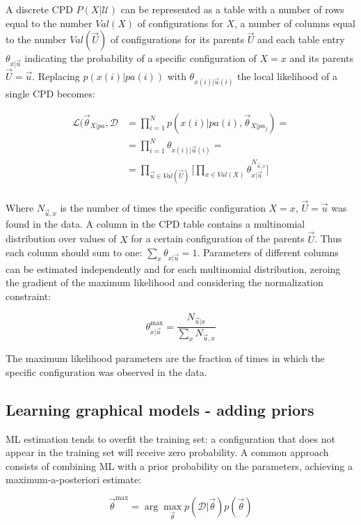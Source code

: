 		A discrete CPD $P(X|\mathcal{U})$ can be represented as a table with a number of rows equal to the number $Val(X)$ of configurations for $X$, a number of columns equal to the number $Val(\vec{U})$ of configurations for its parents $\vec{U}$ and each table entry $\theta_{x|\vec{u}}$ indicating the probability of a specific configuration of $X=x$ and its parents $\vec{U}=\vec{u}$.
		Replacing $p(x(i)|pa(i))$ with $\theta_{x(i)|\vec{u}(i)}$ the local likelihood of a single CPD becomes:

		\begin{align*}
			\mathcal{L}(\vec{\theta}_{X|pa}, \mathcal{D} &= \prod\limits_{i=1}^Np(x(i)|pa(i), \vec{\theta}_{X|pa_j})=\\
																									 &=\prod\limits_{i=1}^N\theta_{x(i)|\vec{u}(i)}=\\
																									 &=\prod\limits_{\vec{u}\in Val(\vec{U})}\biggl[\prod\limits_{x\in Val(X)}\theta_{x|\vec{u}}^{N_{\vec{u}, x}}\biggr]\\
		\end{align*}

		Where $N_{\vec{u},x}$ is the number of times the specific configuration $X=x$, $\vec{U}=\vec{u}$ was found in the data.
		A column in the CPD table contains a multinomial distribution over values of $X$ for a certain configuration of the parents $\vec{U}$.
		Thus each column should sum to one: $\sum\limits_{x}\theta_{x|\vec{u}}=1$.
		Parameters of different columns can be estimated independently and for each multinomial distribution, zeroing the gradient of the maximum likelihood and considering the normalization constraint:

		$$\theta_{x|\vec{u}}^{\max}=\frac{N_{\vec{u}|x}}{\sum\limits_{x}N_{\vec{u},x}}$$

		The maximum likelihood parameters are the fraction of times in which the specific configuration was observed in the data.

	\subsection{Learning graphical models - adding priors}
	ML estimation tends to overfit the training set: a configuration that does not appear in the training set will receive zero probability.
	A common approach consists of combining ML with a prior probability on the parameters, achieving a maximum-a-posteriori estimate:

	$$\vec{\theta}^{\max} = \arg\max\limits_{\vec{\theta}}p(\mathcal{D}|\vec{\theta})p(\vec{\theta})$$

